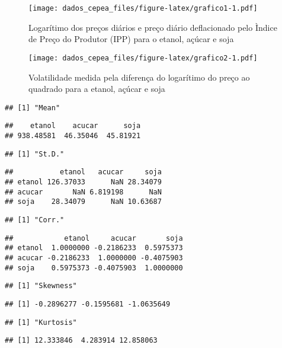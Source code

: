 \documentclass[]{article}
\begin{document}
\begin{figure}[htbp]
\centering
\texttt{[image: dados\_cepea\_files/figure-latex/grafico1-1.pdf]}
\caption{Logarítimo dos preços diários e preço diário deflacionado pelo
Ìndice de Preço do Produtor (IPP) para o etanol, açúcar e soja}
\end{figure}

\begin{figure}[htbp]
\centering
\texttt{[image: dados\_cepea\_files/figure-latex/grafico2-1.pdf]}
\caption{Volatilidade medida pela diferença do logarítimo do preço ao
quadrado para a etanol, açúcar e soja}
\end{figure}

\begin{verbatim}
## [1] "Mean"
\end{verbatim}

\begin{verbatim}
##    etanol    acucar      soja 
## 938.48581  46.35046  45.81921
\end{verbatim}

\begin{verbatim}
## [1] "St.D."
\end{verbatim}

\begin{verbatim}
##           etanol   acucar     soja
## etanol 126.37033      NaN 28.34079
## acucar       NaN 6.819198      NaN
## soja    28.34079      NaN 10.63687
\end{verbatim}

\begin{verbatim}
## [1] "Corr."
\end{verbatim}

\begin{verbatim}
##            etanol     acucar       soja
## etanol  1.0000000 -0.2186233  0.5975373
## acucar -0.2186233  1.0000000 -0.4075903
## soja    0.5975373 -0.4075903  1.0000000
\end{verbatim}

\begin{verbatim}
## [1] "Skewness"
\end{verbatim}

\begin{verbatim}
## [1] -0.2896277 -0.1595681 -1.0635649
\end{verbatim}

\begin{verbatim}
## [1] "Kurtosis"
\end{verbatim}

\begin{verbatim}
## [1] 12.333846  4.283914 12.858063
\end{verbatim}
\end{document}
